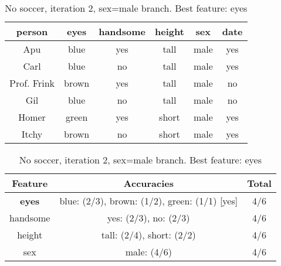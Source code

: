 \begin{table}[h!]
  \centering
  \begin{tabular}{ccccc|c}
    \toprule
    person      & eyes  & handsome & height & sex    & date\\
    \midrule
    Apu         & blue  & yes      & tall   & male   & yes \\
    Carl        & blue  & no       & tall   & male   & yes \\
    Prof. Frink & brown & yes      & tall   & male   & no  \\
    Gil         & blue  & no       & tall   & male   & no  \\
    Homer       & green & yes      & short  & male   & yes \\
    Itchy       & brown & no       & short  & male   & yes \\
    \bottomrule
  \end{tabular}

  \vspace{.5cm}

  \begin{tabular}{ccc}
    \toprule
    Feature       & Accuracies                                    & Total\\
    \midrule
    \textbf{eyes} & blue: (2/3), brown: (1/2), green: (1/1) [yes] & 4/6\\
    handsome      & yes: (2/3), no: (2/3)                         & 4/6\\
    height        & tall: (2/4), short: (2/2)                     & 4/6\\
    sex           & male: (4/6)                                   & 4/6\\
    \bottomrule
  \end{tabular}
  \caption*{No soccer, iteration 2, sex=male branch. Best feature: eyes}
\end{table}

